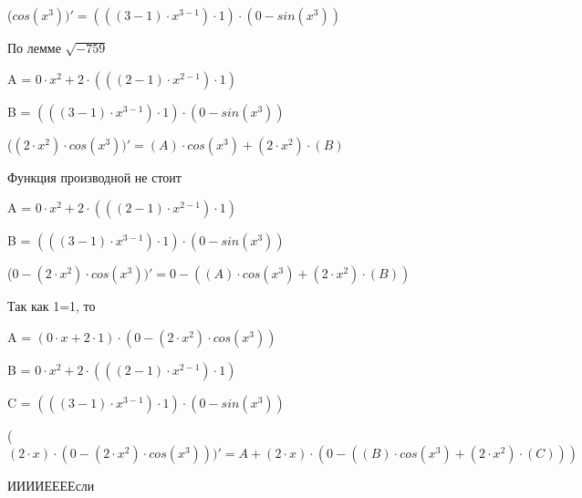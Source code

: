 \documentclass[12pt,a4paper,fleqn]{article}
\begin{document}
\begin{center}
 ($cos(x^{3}))'
  = (((3-1) \cdot x^{3-1}) \cdot 1) \cdot (0-sin(x^{3}))$\end{center}
По лемме $\sqrt{-759}$
\begin{center}
A = $0 \cdot x^{2}+2 \cdot (((2-1) \cdot x^{2-1}) \cdot 1)$\end{center}
\begin{center}
B = $(((3-1) \cdot x^{3-1}) \cdot 1) \cdot (0-sin(x^{3}))$\end{center}
\begin{center}
 ($(2 \cdot x^{2}) \cdot cos(x^{3}))'
  = (A) \cdot cos(x^{3})+(2 \cdot x^{2}) \cdot (B)$\end{center}
Функция производной не стоит\cite{link2}

\begin{center}
A = $0 \cdot x^{2}+2 \cdot (((2-1) \cdot x^{2-1}) \cdot 1)$\end{center}
\begin{center}
B = $(((3-1) \cdot x^{3-1}) \cdot 1) \cdot (0-sin(x^{3}))$\end{center}
\begin{center}
 ($0-(2 \cdot x^{2}) \cdot cos(x^{3}))'
  = 0-((A) \cdot cos(x^{3})+(2 \cdot x^{2}) \cdot (B))$\end{center}
Так как 1=1, то\cite{link4}

\begin{center}
A = $(0 \cdot x+2 \cdot 1) \cdot (0-(2 \cdot x^{2}) \cdot cos(x^{3}))$\end{center}
\begin{center}
B = $0 \cdot x^{2}+2 \cdot (((2-1) \cdot x^{2-1}) \cdot 1)$\end{center}
\begin{center}
C = $(((3-1) \cdot x^{3-1}) \cdot 1) \cdot (0-sin(x^{3}))$\end{center}
\begin{center}
 ($(2 \cdot x) \cdot (0-(2 \cdot x^{2}) \cdot cos(x^{3})))'
  = A+(2 \cdot x) \cdot (0-((B) \cdot cos(x^{3})+(2 \cdot x^{2}) \cdot (C)))$\end{center}
ИИИИЕЕЕЕсли\cite{link3}
\end{document}
